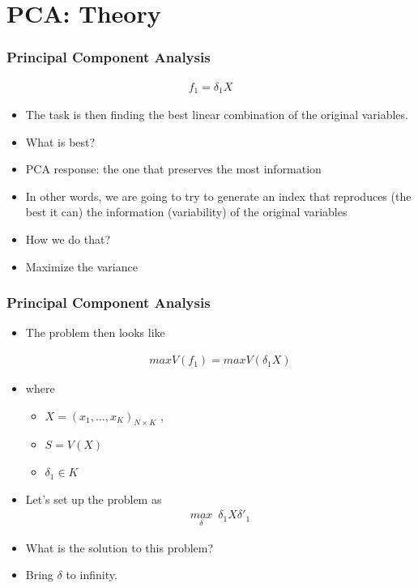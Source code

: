 \documentclass[
  shownotes,
  xcolor={svgnames},
  hyperref={colorlinks,citecolor=DarkBlue,linkcolor=DarkRed,urlcolor=DarkBlue}
  , aspectratio=169]{beamer}
\begin{document}
\section{PCA: Theory}
\begin{frame}
\frametitle{Principal Component Analysis}

\begin{align}
f_1 = \delta_1 X
\end{align}


\begin{itemize}

  \item The task is then finding the best linear combination of the original variables.
  \medskip
  \item What is best?
  \medskip
  \pause
  \item PCA response: the one that preserves the most information
  \medskip
  \item In other words, we are going to try to generate an index that reproduces (the best it can) the information (variability) of the original variables
  \medskip
  \item How we do that?
  \pause
  \medskip
  \item Maximize the variance

\end{itemize}   
\end{frame}
\begin{frame}
\frametitle{Principal Component Analysis}

\begin{itemize}
  \item The problem then looks like

  \begin{align}
  max V(f_1) = max V(\delta_1 X)
  \end{align}

  \item where
  \begin{itemize}
    \item $X = (x_1 , \dots , x_K)_{N \times K}$  , 
    \item $S = V(X)$ 
    \item $\delta_1 \in K$
 \end{itemize}
  \item Let's set up the problem as 
  \begin{align}
  \underset{\delta}{max}\,\,\, \delta_1 X \delta'_1
  \end{align}

  \item What is the solution to this problem?

 \pause
  \item Bring $\delta$ to infinity. 
 
\end{itemize}
 \end{frame}
\end{document}
